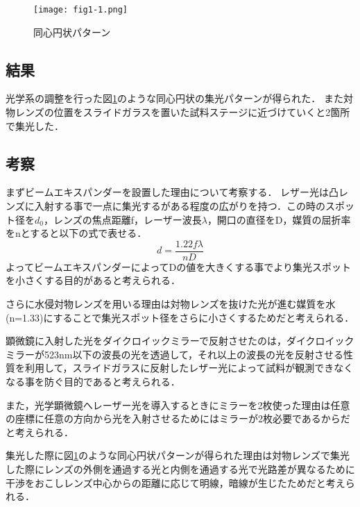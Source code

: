 \documentclass[11pt, a4paper,twocolumn]{jarticle}
\begin{document}
\begin{figure}[htbp]
 \begin{center}
  \texttt{[image: fig1-1.png]}
 \end{center}
 \caption{同心円状パターン}
 \label{fig:1-1}
\end{figure}

\subsection{結果}
光学系の調整を行った図\ref{fig:1-1}のような同心円状の集光パターンが得られた．
また対物レンズの位置をスライドガラスを置いた試料ステージに近づけていくと2箇所で集光した．



\subsection{考察}
まずビームエキスパンダーを設置した理由について考察する．
レザー光は凸レンズに入射する事で一点に集光するがある程度の広がりを持つ．この時のスポット径を$d_0$，レンズの焦点距離f，レーザー波長$\lambda$，開口の直径をD，媒質の屈折率をnとすると以下の式で表せる．
\begin{equation}
    d = \frac{1.22f\lambda}{nD}
\end{equation}
よってビームエキスパンダーによってDの値を大きくする事でより集光スポットを小さくする目的があると考えられる．

さらに水侵対物レンズを用いる理由は対物レンズを抜けた光が進む媒質を水(n=1.33)にすることで集光スポット径をさらに小さくするためだと考えられる．

顕微鏡に入射した光をダイクロイックミラーで反射させたのは，ダイクロイックミラーが523nm以下の波長の光を透過して，それ以上の波長の光を反射させる性質を利用して，スライドガラスに反射したレザー光によって試料が観測できなくなる事を防ぐ目的であると考えられる．

また，光学顕微鏡へレーザー光を導入するときにミラーを2枚使った理由は任意の座標に任意の方向から光を入射させるためにはミラーが2枚必要であるからだと考えられる．

集光した際に図\ref{fig:1-1}のような同心円状パターンが得られた理由は対物レンズで集光した際にレンズの外側を通過する光と内側を通過する光で光路差が異なるために干渉をおこしレンズ中心からの距離に応じて明線，暗線が生じたためだと考えられる．

\newpage
\end{document}
